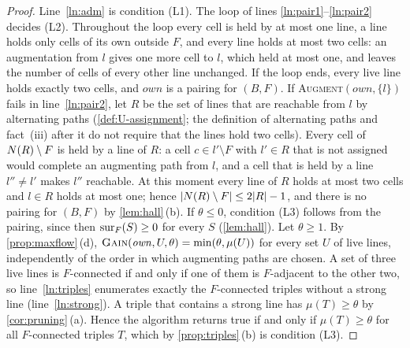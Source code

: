 \begin{proof}
Line~\ref{ln:adm} is condition (L1). The loop of lines \ref{ln:pair1}--\ref{ln:pair2} decides (L2). Throughout the loop every cell is held
by at most one line, a line holds only cells of its own outside $F$, and every line holds at most two
cells: an augmentation from $l$ gives one more cell to $l$, which held at most one, and leaves the
number of cells of every other line unchanged. If the loop ends, every live line holds exactly two
cells, and $\mathit{own}$ is a pairing for $(B,F)$. If \textsc{Augment}$(\mathit{own},\{l\})$ fails in
line~\ref{ln:pair2}, let $R$ be the set of lines that are reachable from $l$ by alternating paths
(\cref{def:U-assignment}; the definition of alternating paths and fact~(iii) after it do not require
that the lines hold two cells). Every cell of $N(R)\setminus F$ is held by a line of $R$: a cell
$c\in l'\setminus F$ with $l'\in R$ that is not assigned would complete an augmenting path from $l$,
and a cell that is held by a line $l''\ne l'$ makes $l''$ reachable. At this moment every line of $R$
holds at most two cells and $l\in R$ holds at most one; hence $|N(R)\setminus F|\le 2|R|-1$, and there
is no pairing for $(B,F)$ by \cref{lem:hall}\,(b). If $\theta\le 0$, condition (L3)
follows from the pairing, since then $\operatorname{sur}_F(S)\ge 0$ for every $S$ (\cref{lem:hall}). Let $\theta\ge1$. By
\cref{prop:maxflow}\,(d), $\textsc{Gain}(\mathit{own},U,\theta)=\min(\theta,\mu(U))$ for every set $U$ of
live lines, independently of the order in which augmenting paths are chosen. A set of three live lines is
$F$-connected if and only if one of them is $F$-adjacent to the other two, so
line~\ref{ln:triples} enumerates exactly the $F$-connected triples without a strong line
(line~\ref{ln:strong}). A triple that contains a strong line has
$\mu(T)\ge\theta$ by \cref{cor:pruning}\,(a). Hence the algorithm returns true if and only if
$\mu(T)\ge\theta$ for all $F$-connected triples $T$, which by \cref{prop:triples}\,(b) is condition (L3).
\end{proof}

